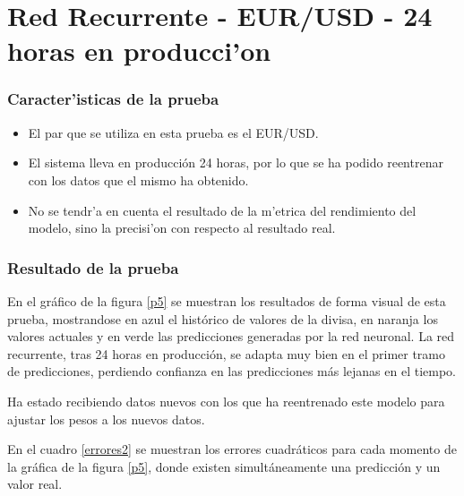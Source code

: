 \clearpage

\section{Red Recurrente - EUR/USD - 24 horas en producci'on}\label{sec:pruebarecbaja}


\subsubsection*{Caracter'isticas de la prueba}
\begin{itemize}
\item El par que se utiliza en esta prueba es el EUR/USD.
\item El sistema lleva en producción 24 horas, por lo que se ha podido reentrenar con los datos que el mismo  ha obtenido. 
\item No se tendr'a en cuenta el resultado de la m'etrica del rendimiento del modelo, sino la precisi'on con respecto al resultado real.
\end{itemize}

\subsubsection*{Resultado de la prueba}

En el gráfico de la figura \ref{p5} se muestran los resultados de forma visual de esta prueba, mostrandose en azul el histórico de valores de la divisa, en naranja los valores actuales y en verde las predicciones generadas por la red neuronal. La red recurrente, tras 24 horas en producción, se adapta muy bien en el primer tramo de predicciones, perdiendo confianza en las predicciones más lejanas en el tiempo. 

Ha estado recibiendo datos nuevos con los que ha reentrenado este modelo para ajustar los pesos a los nuevos datos.


En el cuadro  \ref{errores2} se muestran los errores cuadráticos para cada momento de la gráfica de la figura \ref{p5}, donde existen simultáneamente una predicción y un valor real.

